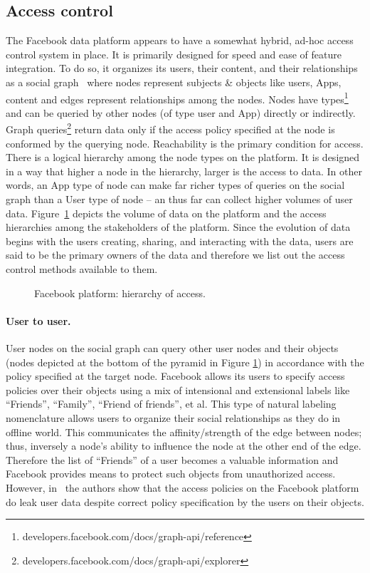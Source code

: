 \documentclass[a4paper,twoside]{article}
\begin{document}
\subsection{Access control}
The Facebook data platform appears to have a somewhat hybrid, ad-hoc
access control system in place. It is primarily designed for speed and
ease of feature integration. To do so, it organizes its users, their
content, and their relationships as a social graph~\cite{fb-tao} where
nodes represent subjects \& objects like users, Apps, content and
edges represent relationships among the nodes. Nodes have
types\footnote{developers.facebook.com/docs/graph-api/reference} and
can be queried by other nodes (of type user and App) directly or
indirectly. Graph
queries\footnote{developers.facebook.com/docs/graph-api/explorer}
return data only if the access policy specified at the node is
conformed by the querying node. Reachability is the primary condition
for access. There is a logical hierarchy among the node types on the
platform. It is designed in a way that higher a node in the hierarchy,
larger is the access to data. In other words, an App type of node can
make far richer types of queries on the social graph than a User type
of node -- an thus far can collect higher volumes of user
data. Figure~\ref{fig:access-hierarchy} depicts the volume of data on
the platform and the access hierarchies among the stakeholders of the
platform. Since the evolution of data begins with the users creating,
sharing, and interacting with the data, users are said to be the
primary owners of the data and therefore we list out the access
control methods available to them.
\begin{figure}[!tp]
  \centering
  {}
  \caption{Facebook platform: hierarchy of access.}
  \label{fig:access-hierarchy}
\end{figure}
\paragraph{User to user.} User nodes on the social graph can query
other user nodes and their objects (nodes depicted at the bottom of
the pyramid in Figure \ref{fig:access-hierarchy}) in accordance with
the policy specified at the target node. Facebook allows its users to
specify access policies over their objects using a mix of intensional
and extensional labels like ``Friends'', ``Family'', ``Friend of
friends'', et al. This type of natural labeling nomenclature allows
users to organize their social relationships as they do in offline
world. This communicates the affinity/strength of the edge between
nodes; thus, inversely a node's ability to influence the node at the
other end of the edge. Therefore the list of ``Friends'' of a user
becomes a valuable information and Facebook provides means to protect
such objects from unauthorized access. However, in~\cite{vtp-rks-fb1}
the authors show that the access policies on the Facebook platform do
leak user data despite correct policy specification by the users on
their objects.
\end{document}
